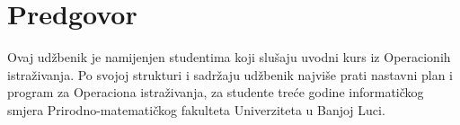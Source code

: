 \documentclass[a4paper, utf8, 11pt, colorlinks]{book}
\theoremstyle{definition}
\begin{document}

 
\newpage
 
\tableofcontents

\newpage
\chapter*{Predgovor}
Ovaj udžbenik je namijenjen studentima koji slušaju uvodni kurs iz Opera\-cionih istraživanja. Po svojoj strukturi i sadržaju udžbenik najviše prati nastavni plan i program za Operaciona istraživanja, za studente treće godine informatičkog smjera Prirodno-matematičkog fakulteta Univerziteta u Banjoj Luci.
\end{document}
